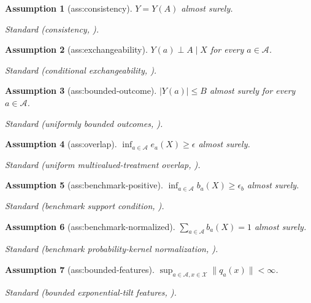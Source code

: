 \documentclass{article}
\newtheorem{assumption}{Assumption}
\begin{document}
\begin{assumption}[ass:consistency]\label{ass:consistency}
\(Y=Y(A)\) almost surely.
\par\smallskip\noindent\emph{Standard} (consistency, \cite{FangRidderXie2026}).
\end{assumption}

\begin{assumption}[ass:exchangeability]\label{ass:exchangeability}
\(Y(a)\perp A\mid X\) for every \(a\in\mathcal A\).
\par\smallskip\noindent\emph{Standard} (conditional exchangeability, \cite{FangRidderXie2026}).
\end{assumption}

\begin{assumption}[ass:bounded-outcome]\label{ass:bounded-outcome}
\(|Y(a)|\le B\) almost surely for every \(a\in\mathcal A\).
\par\smallskip\noindent\emph{Standard} (uniformly bounded outcomes, \cite{FangRidderXie2026}).
\end{assumption}

\begin{assumption}[ass:overlap]\label{ass:overlap}
\(\inf_{a\in\mathcal A}e_a(X)\ge\epsilon\) almost surely.
\par\smallskip\noindent\emph{Standard} (uniform multivalued-treatment overlap, \cite{ChernozhukovEtAl2018DML}).
\end{assumption}

\begin{assumption}[ass:benchmark-positive]\label{ass:benchmark-positive}
\(\inf_{a\in\mathcal A}b_a(X)\ge\epsilon_b\) almost surely.
\par\smallskip\noindent\emph{Standard} (benchmark support condition, \cite{FangRidderXie2026}).
\end{assumption}

\begin{assumption}[ass:benchmark-normalized]\label{ass:benchmark-normalized}
\(\sum_{a\in\mathcal A}b_a(X)=1\) almost surely.
\par\smallskip\noindent\emph{Standard} (benchmark probability-kernel normalization, \cite{FangRidderXie2026}).
\end{assumption}

\begin{assumption}[ass:bounded-features]\label{ass:bounded-features}
\(\sup_{a\in\mathcal A,x\in\mathcal X}\|q_a(x)\|<\infty\).
\par\smallskip\noindent\emph{Standard} (bounded exponential-tilt features, \cite{FangRidderXie2026}).
\end{assumption}
\end{document}
